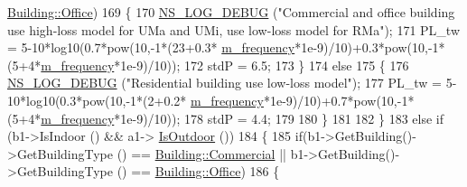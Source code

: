 \begin{DoxyCode}
      \hyperlink{classns3_1_1Building_af7f3940d00690b70af02310575d94ef3acbb89a32dbb85f1eb6ac70baf61a0735}{Building::Office})
169                                                 \{
170                                                         \hyperlink{group__logging_ga413f1886406d49f59a6a0a89b77b4d0a}{NS\_LOG\_DEBUG} (\textcolor{stringliteral}{"Commercial and office
       building use high-loss model for UMa and UMi, use low-loss model for RMa"});
171                                                         PL\_tw = 5-10*log10(0.7*pow(10,-1*(23+0.3*
      \hyperlink{classns3_1_1MmWave3gppBuildingsPropagationLossModel_ad7de82f89dfd910f127ce775fec14898}{m\_frequency}*1e-9)/10)+0.3*pow(10,-1*(5+4*\hyperlink{classns3_1_1MmWave3gppBuildingsPropagationLossModel_ad7de82f89dfd910f127ce775fec14898}{m\_frequency}*1e-9)/10));
172                                                         stdP = 6.5;
173                                                 \}
174                                                 \textcolor{keywordflow}{else}
175                                                 \{
176                                                         \hyperlink{group__logging_ga413f1886406d49f59a6a0a89b77b4d0a}{NS\_LOG\_DEBUG} (\textcolor{stringliteral}{"Residential building use
       low-loss model"});
177                                                         PL\_tw = 5-10*log10(0.3*pow(10,-1*(2+0.2*
      \hyperlink{classns3_1_1MmWave3gppBuildingsPropagationLossModel_ad7de82f89dfd910f127ce775fec14898}{m\_frequency}*1e-9)/10)+0.7*pow(10,-1*(5+4*\hyperlink{classns3_1_1MmWave3gppBuildingsPropagationLossModel_ad7de82f89dfd910f127ce775fec14898}{m\_frequency}*1e-9)/10));
178                                                         stdP = 4.4;
179 
180                                                 \}
181 
182                                         \}
183                                         \textcolor{keywordflow}{else} \textcolor{keywordflow}{if} (b1->IsIndoor () && a1->
      \hyperlink{classns3_1_1MobilityBuildingInfo_ae7fba237e7e3eaf40139bec948ec238a}{IsOutdoor} ())
184                                         \{
185                                                 \textcolor{keywordflow}{if}(b1->GetBuilding()->GetBuildingType () == 
      \hyperlink{classns3_1_1Building_af7f3940d00690b70af02310575d94ef3aa2daecca877283b8bb46a201393dcd01}{Building::Commercial} || b1->GetBuilding()->GetBuildingType () == 
      \hyperlink{classns3_1_1Building_af7f3940d00690b70af02310575d94ef3acbb89a32dbb85f1eb6ac70baf61a0735}{Building::Office})
186                                                 \{

\end{DoxyCode}
